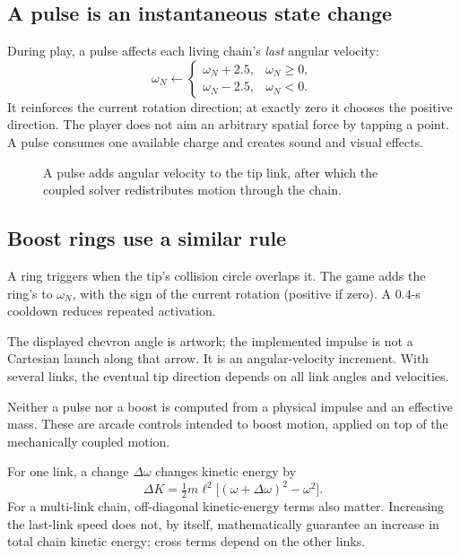 \documentclass[11pt,a4paper]{article}
\newcommand{\code}[1]{\texttt{\detokenize{#1}}}
\begin{document}
\subsection{A pulse is an instantaneous state change}
During play, a pulse affects each living chain's \emph{last} angular velocity:
\[
 \omega_N\leftarrow\begin{cases}\omega_N+2.5,&\omega_N\geq0,\\\omega_N-2.5,&\omega_N<0.\end{cases}
\]
It reinforces the current rotation direction; at exactly zero it chooses the positive direction. The player does not aim an arbitrary spatial force by tapping a point. A pulse consumes one available charge and creates sound and visual effects.
\begin{figure}[H]\centering
{}\caption{A pulse adds angular velocity to the tip link, after which the coupled solver redistributes motion through the chain.}
\end{figure}
\subsection{Boost rings use a similar rule}
A ring triggers when the tip's collision circle overlaps it. The game adds the ring's \code{boostSpd} to \(\omega_N\), with the sign of the current rotation (positive if zero). A \(0.4\)-s cooldown reduces repeated activation.

The displayed chevron angle is artwork; the implemented impulse is not a Cartesian launch along that arrow. It is an angular-velocity increment. With several links, the eventual tip direction depends on all link angles and velocities.
\begin{arcade}Neither a pulse nor a boost is computed from a physical impulse and an effective mass. These are arcade controls intended to boost motion, applied on top of the mechanically coupled motion.\end{arcade}
For one link, a change \(\Delta\omega\) changes kinetic energy by
\[
 \Delta K=\tfrac12m\ell^2\big[(\omega+\Delta\omega)^2-\omega^2\big].
\]
For a multi-link chain, off-diagonal kinetic-energy terms also matter. Increasing the last-link speed does not, by itself, mathematically guarantee an increase in total chain kinetic energy; cross terms depend on the other links.
\end{document}
